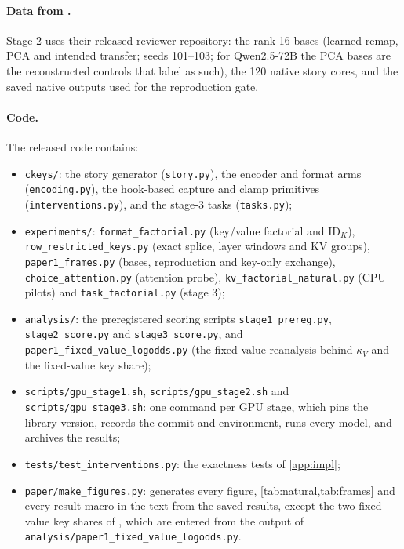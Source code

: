 \paragraph{Data from \citet{anonymous2026fitted}.} Stage 2 uses their released reviewer repository: the rank-16 bases (learned remap, PCA and intended transfer; seeds 101--103; for Qwen2.5-72B the PCA bases are the reconstructed controls that \citet{anonymous2026fitted} label as such), the 120 native story cores, and the saved native outputs used for the reproduction gate.

\paragraph{Code.} The released code contains:
\begin{itemize}\setlength\itemsep{1pt}
  \item \texttt{ckeys/}: the story generator (\texttt{story.py}), the encoder and format arms (\texttt{encoding.py}), the hook-based capture and clamp primitives (\texttt{interventions.py}), and the stage-3 tasks (\texttt{tasks.py});
  \item \texttt{experiments/}: \texttt{format\_factorial.py} (key/value factorial and $\mathrm{ID}_K$), \texttt{row\_restricted\_keys.py} (exact splice, layer windows and KV groups), \texttt{paper1\_frames.py} (bases, reproduction and key-only exchange), \texttt{choice\_attention.py} (attention probe), \texttt{kv\_factorial\_natural.py} (CPU pilots) and \texttt{task\_factorial.py} (stage 3);
  \item \texttt{analysis/}: the preregistered scoring scripts \texttt{stage1\_prereg.py}, \texttt{stage2\_score.py} and \texttt{stage3\_score.py}, and \texttt{paper1\_fixed\_value\_logodds.py} (the fixed-value reanalysis behind $\kappa_V$ and the fixed-value key share);
  \item \texttt{scripts/gpu\_stage1.sh}, \texttt{scripts/gpu\_stage2.sh} and \texttt{scripts/gpu\_stage3.sh}: one command per GPU stage, which pins the library version, records the commit and environment, runs every model, and archives the results;
  \item \texttt{tests/test\_interventions.py}: the exactness tests of \cref{app:impl};
  \item \texttt{paper/make\_figures.py}: generates every figure, \cref{tab:natural,tab:frames} and every result macro in the text from the saved results, except the two fixed-value key shares of \citet{anonymous2026fitted}, which are entered from the output of \texttt{analysis/paper1\_fixed\_value\_logodds.py}.
\end{itemize}

